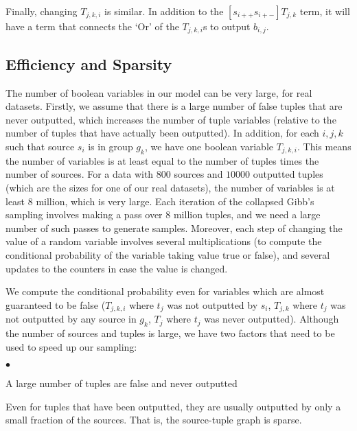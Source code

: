 \documentclass{sig-alternate}
\newcounter{prob}
\newcommand{\squishlist}{
   \begin{list}{$\bullet$}
    { \setlength{\itemsep}{0pt}
      \setlength{\parsep}{2pt}
      \setlength{\topsep}{2pt}
      \setlength{\partopsep}{0pt}
    }
}
\newcommand{\squishend}{\end{list}}
\begin{document}
Finally, changing $T_{j,k,i}$ is similar. In addition to the $[s_{i++} s_{i+-}] T_{j,k}$ term, it will have a term that connects the `Or' of the $T_{j,k,i}$s to output $b_{i,j}$. 

\subsection{Efficiency and Sparsity} 
The number of boolean variables in our model can be very large, for real datasets. Firstly, we assume that there is a large number of false tuples that are never outputted, which increases the number of tuple variables (relative to the number of tuples that have actually been outputted). In addition, for each $i, j, k$ such that source $s_i$ is in group $g_k$, we have one boolean variable $T_{j,k,i}$. This means the number of variables is at least equal to the number of tuples times the number of sources. For a data with $800$ sources and $10000$ outputted tuples (which are the sizes for one of our real datasets), the number of variables is at least $8$ million, which is very large. Each iteration of the collapsed Gibb's sampling involves making a pass over $8$ million tuples, and we need a large number of such passes to generate samples. Moreover, each step of changing the value of a random variable involves several multiplications (to compute the conditional probability of the variable taking value true or false), and several updates to the counters in case the value is changed. 

We compute the conditional probability even for variables which are almost guaranteed to be false ($T_{j,k,i}$ where $t_j$ was not outputted by $s_i$, $T_{j,k}$ where $t_j$ was not outputted by any source in $g_k$, $T_j$ where $t_j$ was never outputted). Although the number of sources and tuples is large, we have two factors that need to be used to speed up our sampling:
\squishlist
\item A large number of tuples are false and never outputted
\item Even for tuples that have been outputted, they are usually outputted by only a small fraction of the sources. That is, the source-tuple graph is sparse.
\squishend

\end{document}
